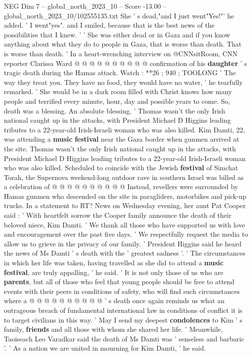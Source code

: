 \begin{textsample}{NEG Dim 7 – global\_north\_2023\_10 – Score -13.00 – global\_north\_2023\_10/102555135.txt}
She ' s dead,"and I just went"Yes!"' he added. ' I went"yes". and I smiled, because that is the best news of the possibilities that I knew. ' ' She was either dead or in Gaza and if you know anything about what they do to people in Gaza, that is worse than death.
That is worse than death. ' In a heart-wrenching interview on @CNNsitRoom, CNN reporter Clarissa Ward @ @ @ @ @ @ @ @ @ @ confirmation of his \textbf{daughter} ' s tragic death during the Hamas attack.
Watch : **26 ; 940 ; TOOLONG ' The way they treat you.
They have no food, they would have no water, ' he tearfully remarked. ' She would be in a dark room filled with Christ knows how many people and terrified every minute, hour, day and possible years to come.
So, death was a blessing.
An absolute blessing. ' Thomas wasn't the only Irish national caught up in the attacks, with President Michael D Higgins leading tributes to a 22-year-old Irish-Israeli woman who was also killed.
Kim Damti, 22, was attending a \textbf{music} \textbf{festival} near the Gaza border when gunmen arrived at the site.
Thomas wasn't the only Irish national caught up in the attacks, with President Michael D Higgins leading tributes to a 22-year-old Irish-Israeli woman who was also killed.
Scheduled to coincide with the Jewish \textbf{festival} of Simchat Torah, the Supernova weekend-long outdoor rave in southern Israel was billed as a celebration of @ @ @ @ @ @ @ @ @ @ Instead, revellers were surrounded by Hamas gunmen who descended on the site in paragliders, motorbikes and pick-up trucks.
In a statement to RT?
News on Wednesday evening, her aunt Pat Cooper said : ' With heartfelt sorrow the Cooper family announce the death of their beloved niece, Kim Damti. ' We thank all those who have supported us with love and encouragement over the past five days. ' We respectfully request the media to allow us to grieve in the privacy of our family. ' President Higgins said he heard the news of Ms Damti ' s death with the ' greatest sadness '. ' The circumstances in which her life was taken, having travelled as she did to attend a \textbf{music} \textbf{festival}, are truly appalling, ' he said. ' It is not only those of us who are \textbf{parents}, but all of those who feel that young people should be free to attend events with their peers in conditions of safety, who will find such circumstances where a @ @ @ @ @ @ @ @ @ @ ' s death once again reminds us what an outrageous breach of fundamental international law in conditions of conflict it is to target civilians in this way. ' May I send my deepest \textbf{condolences} to Kim ' s family, \textbf{friends} and all those with whom she shared her life. ' Meanwhile, Taoiseach Leo Varadkar said the death of Ms Damti was ' senseless and barbaric '. ' As a nation we are united in mourning for Kim Damti, ' he said.

\end{textsample}
